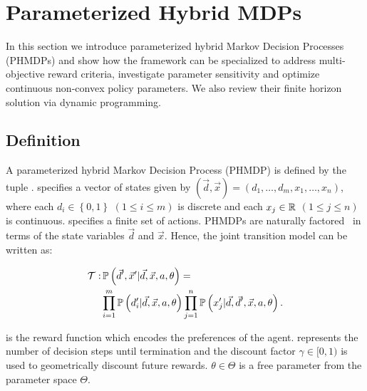 \section{Parameterized Hybrid MDPs}
\label{sec:hybrid_mdps}

In this section we introduce parameterized hybrid Markov Decision Processes (PHMDPs) and show how the framework can be specialized to address multi-objective reward criteria, investigate parameter sensitivity and optimize continuous non-convex policy parameters. We also review their finite horizon solution via dynamic programming.

\subsection{Definition}
\label{sec:hybrid_mdps_def}

A parameterized hybrid Markov Decision Process (PHMDP) is defined by the tuple {\footnotesize \PMDPTuple}. {\footnotesize \State} specifies a vector of states given by {\footnotesize $(\vec{d}, \vec{x}) = \left( d_1, \ldots, d_m, x_1, \ldots, x_n \right) $}, where each {\footnotesize $ d_i \in \left\lbrace 0, 1 \right\rbrace $} {\footnotesize $\left( 1 \leq i \leq m \right)$} is discrete and each {\footnotesize$ x_j \in \mathbb{R} $} {\footnotesize $\left( 1 \leq j \leq n \right)$} is continuous. {\footnotesize \Action} specifies a finite set of actions. PHMDPs
are naturally factored~\parencite{Boutilier_JAIR_1999} in terms of the state variables {\footnotesize$\vec{d}$} and {\footnotesize $\vec{x}$}. Hence, the joint transition model can be written as:

{\footnotesize
\abovedisplayskip=0pt
\belowdisplayskip=0pt
\begin{align}
    \label{eq:hmdp_tfunc}
    \mathcal{T} :& \, \mathbb{P}\left({\vec{d}', \vec{x}' | \vec{d}, \vec{x}, a, \theta}\right) = \nonumber \\
    & \prod_{i=1}^{m} \mathbb{P}\left({d_i' | \vec{d}, \vec{x}, a, \theta}\right) \prod_{j=1}^{n} \mathbb{P}\left({x_j' | \vec{d}, \vec{d}', \vec{x}, a, \theta}\right).
\end{align}   
}

{\footnotesize \RewardFunc} is the reward function which encodes the preferences of the agent. {\footnotesize \Horizon} represents the number of decision steps until termination and the discount factor {\footnotesize $\gamma \in [0, 1)$} is used to geometrically discount future rewards. {\footnotesize $\theta \in \Theta$} is a free parameter from the parameter space {\footnotesize $ \Theta $}.

